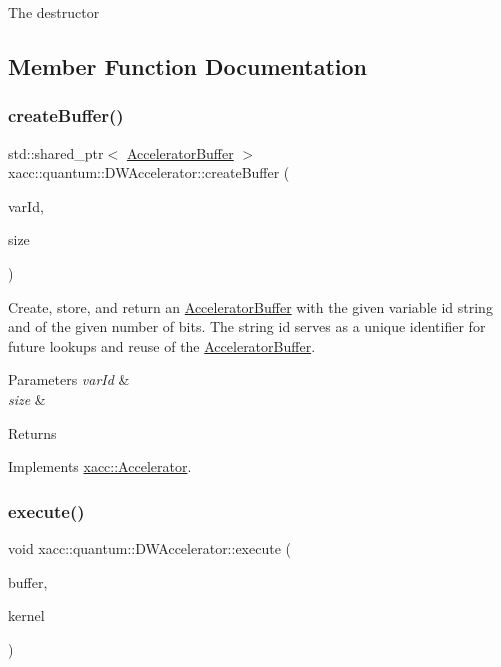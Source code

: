 The destructor 

\subsection{Member Function Documentation}
\mbox{\label{a01133_a718d7cb51a35e694d960385e1ea2f99f}} 
\subsubsection{\texorpdfstring{create\+Buffer()}{createBuffer()}}
{\footnotesize\ttfamily std\+::shared\+\_\+ptr$<$ \hyperlink{a01625}{Accelerator\+Buffer} $>$ xacc\+::quantum\+::\+D\+W\+Accelerator\+::create\+Buffer (\begin{DoxyParamCaption}\item[{const std\+::string \&}]{var\+Id,  }\item[{const int}]{size }\end{DoxyParamCaption})\hspace{0.3cm}{\ttfamily [virtual]}}

Create, store, and return an \hyperlink{a01625}{Accelerator\+Buffer} with the given variable id string and of the given number of bits. The string id serves as a unique identifier for future lookups and reuse of the \hyperlink{a01625}{Accelerator\+Buffer}.


\begin{DoxyParams}{Parameters}
{\em var\+Id} & \\
\hline
{\em size} & \\
\hline
\end{DoxyParams}
\begin{DoxyReturn}{Returns}

\end{DoxyReturn}


Implements \hyperlink{a01613_a064a2dbd58338364115c260267806945}{xacc\+::\+Accelerator}.

\mbox{\label{a01133_aa8d770acb2708b3ee1cd1f21bd0cc668}} 
\subsubsection{\texorpdfstring{execute()}{execute()}}
{\footnotesize\ttfamily void xacc\+::quantum\+::\+D\+W\+Accelerator\+::execute (\begin{DoxyParamCaption}\item[{std\+::shared\+\_\+ptr$<$ \hyperlink{a01625}{Accelerator\+Buffer} $>$}]{buffer,  }\item[{const std\+::shared\+\_\+ptr$<$ \hyperlink{a01653}{xacc\+::\+Function} $>$}]{kernel }\end{DoxyParamCaption})\hspace{0.3cm}{\ttfamily [virtual]}}

